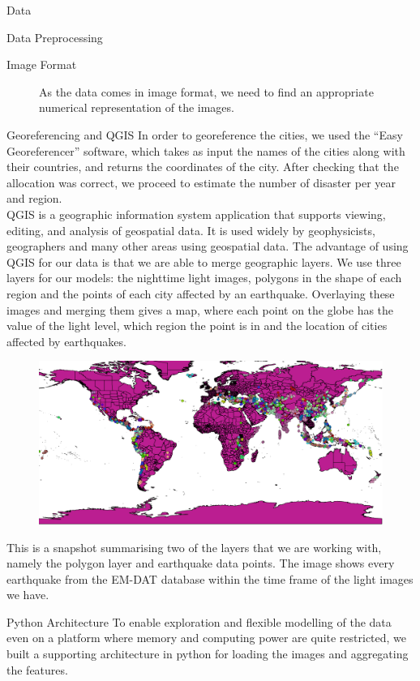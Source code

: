 \documentclass[12pt,fleqn,leqno,letterpaper]{article}
\begin{document}
\begin{section}{Data}
\begin{subsection}{Data Preprocessing}
\begin{description}
      \item[Image Format]{As the data comes in image format, we need to find an appropriate numerical representation of the images.}
    \end{description}
	\begin{subsubsection}{Georeferencing and QGIS}
			In order to georeference the cities, we used the ``Easy Georeferencer'' software, which takes as input the names of the cities along with their countries, and returns the coordinates of the city. After checking that the allocation was correct, we proceed to estimate the number of disaster per year and region. \\
			QGIS is a geographic information system application that supports viewing, editing, and analysis of geospatial data. It is used widely by geophysicists, geographers and many other areas using geospatial data. The advantage of using QGIS for our data is that we are able to merge geographic layers. We use three layers for our models: the nighttime light images, polygons in the shape of each region and the points of each city affected by an earthquake. Overlaying these images and merging them gives a map, where each point on the globe has the value of the light level, which region the point is in and the location of cities affected by earthquakes.   
			\begin{figure}[htbp]
			\includegraphics[width=1\linewidth]{world_regions.png}
			\centering
			\end{figure}
			This is a snapshot summarising two of the layers that we are working with, namely the polygon layer and earthquake data points. The image shows every earthquake from the EM-DAT database within the time frame of the light images we have.
    \end{subsubsection}
    \begin{subsubsection}{Python Architecture}
      To enable exploration and flexible modelling of the data even on a platform where memory and computing power are quite restricted, we built a supporting architecture in python for loading the images and aggregating the features.

\end{subsubsection}
\end{subsection}
\end{section}
\end{document}
